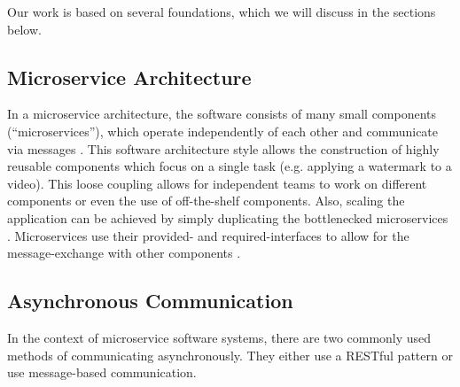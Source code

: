 Our work is based on several foundations, which we will discuss in the sections below.

\subsection{Microservice Architecture}
\label{sec:Foundation:MicroserviceArchitecture}
In a microservice architecture, the software consists of many small components (``microservices''), which operate independently of each other and communicate via messages \cite{Dragoni2017}.
This software architecture style allows the construction of highly reusable components which focus on a single task (e.g. applying a watermark to a video).
This loose coupling allows for independent teams to work on different components or even the use of off-the-shelf components.
Also, scaling the application can be achieved by simply duplicating the bottlenecked microservices \cite{Dragoni2017}.
Microservices use their provided- and required-interfaces to allow for the message-exchange with other components \cite{Singh2021}.

\subsection{Asynchronous Communication}
\label{sec:Foundation:AsyncCommunication}
In the context of microservice software systems, there are two commonly used methods of communicating asynchronously.
They either use a RESTful pattern or use message-based communication.


